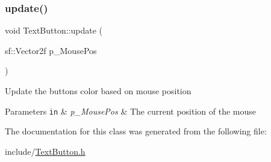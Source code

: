 \subsubsection{\texorpdfstring{update()}{update()}}
{\footnotesize\ttfamily void Text\+Button\+::update (\begin{DoxyParamCaption}\item[{sf\+::\+Vector2f}]{p\+\_\+\+Mouse\+Pos }\end{DoxyParamCaption})}

Update the buttons color based on mouse position 
\begin{DoxyParams}[1]{Parameters}
\mbox{\tt in}  & {\em p\+\_\+\+Mouse\+Pos} & The current position of the mouse \\
\hline
\end{DoxyParams}


The documentation for this class was generated from the following file\+:\begin{DoxyCompactItemize}
\item 
include/\hyperlink{_text_button_8h}{Text\+Button.\+h}\end{DoxyCompactItemize}
